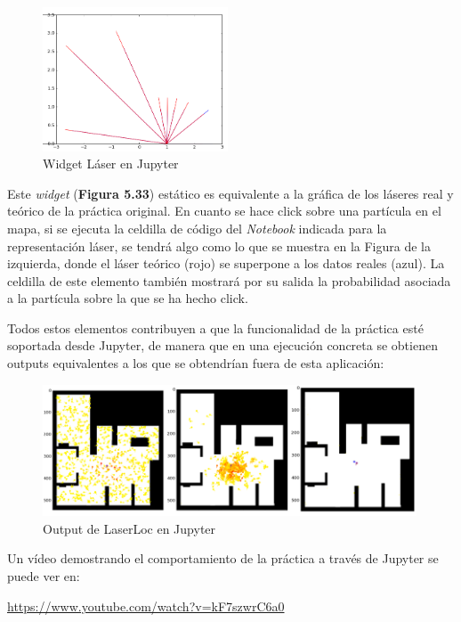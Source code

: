 \begin{multicols}{2}
\begin{figure}[H]
	\begin{center}
		\includegraphics[width=0.49\textwidth]{figures/laserjupyter.png}
		\caption{Widget Láser en Jupyter}
		\label{fig.laserjupyter}
	\end{center}
\end{figure}

Este \textit{widget} (\textbf{Figura 5.33}) estático es equivalente a la gráfica de los láseres real y teórico de la práctica original. En cuanto se hace click sobre una partícula en el mapa, si se ejecuta la celdilla de código del \textit{Notebook} indicada para la representación láser, se tendrá algo como lo que se muestra en la Figura de la izquierda, donde el láser teórico (rojo) se superpone a los datos reales (azul). La celdilla de este elemento también mostrará por su salida la probabilidad asociada a la partícula sobre la que se ha hecho click.
\end{multicols}

Todos estos elementos contribuyen a que la funcionalidad de la práctica esté soportada desde Jupyter, de manera que en una ejecución concreta se obtienen outputs equivalentes a los que se obtendrían fuera de esta aplicación:

\begin{figure}[H]
	\begin{center}
		\includegraphics[width=0.99\textwidth]{figures/outputjupyterll.png}
		\caption{Output de LaserLoc en Jupyter}
		\label{fig.laserjupyter}
	\end{center}
\end{figure}

Un vídeo demostrando el comportamiento de la práctica a través de Jupyter se puede ver en:

\url{https://www.youtube.com/watch?v=kF7szwrC6a0}
